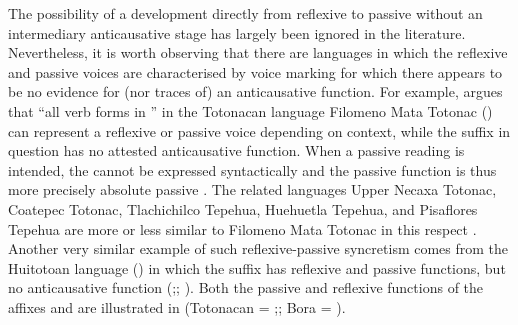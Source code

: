 The possibility of a development directly from reflexive to passive without an intermediary anticausative stage has largely been ignored in the literature. Nevertheless, it is worth observing that there are languages in which the reflexive and passive voices are characterised by voice marking for which there appears to be no evidence for (nor traces of) an anticausative function. For example, \cite[188]{mcfarland:2009} argues that “all verb forms in ” in the Totonacan language Filomeno Mata Totonac () can represent a reflexive or passive voice depending on context, while the suffix in question has no attested anticausative function. When a passive reading is intended, the  cannot be expressed syntactically and the passive function is thus more precisely absolute passive \citep[188]{mcfarland:2009}. The related languages Upper Necaxa Totonac, Coatepec Totonac, Tlachichilco Tepehua, Huehuetla Tepehua, and Pisaflores Tepehua are more or less similar to Filomeno Mata Totonac in this respect \citep[22ff.]{beck:nd}. Another very similar example of such reflexive-passive syncretism comes from the Huitotoan language  () in which the suffix  has reflexive and passive functions, but no anticausative function (\citealt[147f.]{thiesen:weber:2012};; \citealt[1499f.]{seifart:2015}). Both the passive and reflexive functions of the affixes  and  are illustrated in  (Totonacan = \citealt[22ff.]{beck:nd};; Bora = \citealt[148]{thiesen:weber:2012}).

